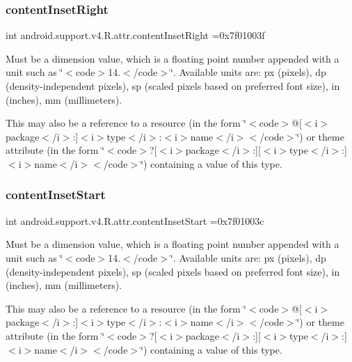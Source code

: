 \subsubsection{\texorpdfstring{content\+Inset\+Right}{contentInsetRight}}
{\footnotesize\ttfamily int android.\+support.\+v4.\+R.\+attr.\+content\+Inset\+Right =0x7f01003f\hspace{0.3cm}{\ttfamily [static]}}

Must be a dimension value, which is a floating point number appended with a unit such as \char`\"{}$<$code$>$14.\+5sp$<$/code$>$\char`\"{}. Available units are\+: px (pixels), dp (density-\/independent pixels), sp (scaled pixels based on preferred font size), in (inches), mm (millimeters). 

This may also be a reference to a resource (in the form \char`\"{}$<$code$>$@\mbox{[}$<$i$>$package$<$/i$>$\+:\mbox{]}$<$i$>$type$<$/i$>$\+:$<$i$>$name$<$/i$>$$<$/code$>$\char`\"{}) or theme attribute (in the form \char`\"{}$<$code$>$?\mbox{[}$<$i$>$package$<$/i$>$\+:\mbox{]}\mbox{[}$<$i$>$type$<$/i$>$\+:\mbox{]}$<$i$>$name$<$/i$>$$<$/code$>$\char`\"{}) containing a value of this type. \mbox{\label{classandroid_1_1support_1_1v4_1_1R_1_1attr_a271705b242fb5e101f893f6821b0149f}} 
\subsubsection{\texorpdfstring{content\+Inset\+Start}{contentInsetStart}}
{\footnotesize\ttfamily int android.\+support.\+v4.\+R.\+attr.\+content\+Inset\+Start =0x7f01003c\hspace{0.3cm}{\ttfamily [static]}}

Must be a dimension value, which is a floating point number appended with a unit such as \char`\"{}$<$code$>$14.\+5sp$<$/code$>$\char`\"{}. Available units are\+: px (pixels), dp (density-\/independent pixels), sp (scaled pixels based on preferred font size), in (inches), mm (millimeters). 

This may also be a reference to a resource (in the form \char`\"{}$<$code$>$@\mbox{[}$<$i$>$package$<$/i$>$\+:\mbox{]}$<$i$>$type$<$/i$>$\+:$<$i$>$name$<$/i$>$$<$/code$>$\char`\"{}) or theme attribute (in the form \char`\"{}$<$code$>$?\mbox{[}$<$i$>$package$<$/i$>$\+:\mbox{]}\mbox{[}$<$i$>$type$<$/i$>$\+:\mbox{]}$<$i$>$name$<$/i$>$$<$/code$>$\char`\"{}) containing a value of this type. \mbox{\label{classandroid_1_1support_1_1v4_1_1R_1_1attr_a535fdec02c81c64089fb34983715bbd7}} 
